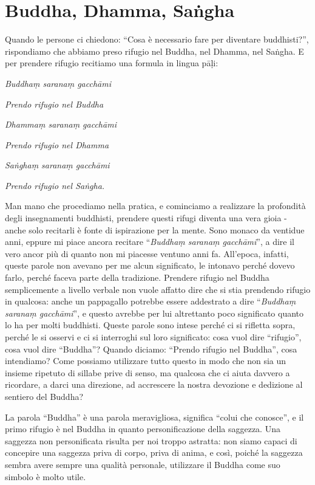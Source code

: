 \chapter{Buddha, Dhamma, Saṅgha}

Quando le persone ci chiedono: ``Cosa è necessario fare per diventare
buddhisti?'', rispondiamo che abbiamo preso rifugio nel Buddha, nel
Dhamma, nel Saṅgha. E per prendere rifugio recitiamo una formula in
lingua pāḷi:

\emph{Buddhaṃ saranaṃ gacchāmi}

\emph{Prendo rifugio nel Buddha}

\emph{Dhammaṃ saranaṃ gacchāmi}

\emph{Prendo rifugio nel Dhamma}

\emph{Saṅghaṃ saranaṃ gacchāmi}

\emph{Prendo rifugio nel Saṅgha.}

Man mano che procediamo nella pratica, e cominciamo a realizzare la
profondità degli insegnamenti buddhisti, prendere questi rifugi diventa
una vera gioia - anche solo recitarli è fonte di ispirazione per la
mente. Sono monaco da ventidue anni, eppure mi piace ancora recitare
``\emph{Buddhaṃ saranaṃ gacchāmi}'', a dire il vero ancor più di quanto
non mi piacesse ventuno anni fa. All'epoca, infatti, queste parole non
avevano per me alcun significato, le intonavo perché dovevo farlo,
perché faceva parte della tradizione. Prendere rifugio nel Buddha
semplicemente a livello verbale non vuole affatto dire che si stia
prendendo rifugio in qualcosa: anche un pappagallo potrebbe essere
addestrato a dire ``\emph{Buddhaṃ saranaṃ gacchāmi}'', e questo avrebbe
per lui altrettanto poco significato quanto lo ha per molti buddhisti.
Queste parole sono intese perché ci si rifletta sopra, perché le si
osservi e ci si interroghi sul loro significato: cosa vuol dire
``rifugio'', cosa vuol dire ``Buddha''? Quando diciamo: ``Prendo rifugio
nel Buddha'', cosa intendiamo? Come possiamo utilizzare tutto questo in
modo che non sia un insieme ripetuto di sillabe prive di senso, ma
qualcosa che ci aiuta davvero a ricordare, a darci una direzione, ad
accrescere la nostra devozione e dedizione al sentiero del Buddha?

La parola ``Buddha'' è una parola meravigliosa, significa ``colui che
conosce'', e il primo rifugio è nel Buddha in quanto personificazione
della saggezza. Una saggezza non personificata risulta per noi troppo
astratta: non siamo capaci di concepire una saggezza priva di corpo,
priva di anima, e così, poiché la saggezza sembra avere sempre una
qualità personale, utilizzare il Buddha come suo simbolo è molto utile.


